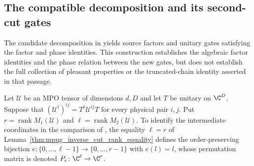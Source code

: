 \subsection{The compatible decomposition and its second-cut gates}

The candidate decomposition in
\cite[lines~5390--5487]{FrancoRubio2025MPUGauging} yields source factors and
unitary gates satisfying the factor and phase identities.
This construction establishes the algebraic factor identities and the phase
relation between the new gates, but does not establish the full collection of
pleasant properties or the truncated-chain identity asserted in that passage.

\begin{definition}
    \label{def:mpug_inverse_cut_rank_equiv}
    \leanok
    Let $\mathcal U$ be an MPO tensor of dimensions $d,D$ and let $T$
    be unitary on $\C^D$. Suppose that
    $(\mathcal U^\dagger)^{ij}=T^\dagger\mathcal U^{ij}T$ for every
    physical pair $i,j$. Put $r=\operatorname{rank}M_1(\mathcal U)$ and
    $\ell=\operatorname{rank}M_2(\mathcal U)$. To identify the intermediate
    coordinates in the comparison of
    \cite[lines~5432--5443]{FrancoRubio2025MPUGauging}, the equality $\ell=r$
    of Lemma~\ref{thm:mpug_inverse_cut_rank_equality} defines the
    order-preserving bijection
    $e\colon\{0,\ldots,\ell-1\}\to\{0,\ldots,r-1\}$ with $e(l)=l$, whose
    permutation matrix is denoted $P_e\colon\C^\ell\to\C^r$.
\end{definition}

